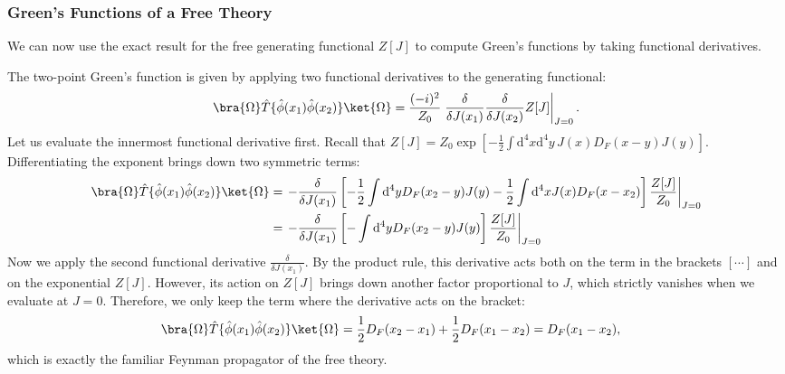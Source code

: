 \subsubsection{Green's Functions of a Free Theory}

We can now use the exact result for the free generating functional \(Z[J]\) to compute Green's functions by taking functional derivatives.

\begin{example}
    The two-point Green's function is given by applying two functional derivatives to the generating functional:
    \[
        \bra{\Omega} \hat{T} \{\hat{\phi}(x_1) \hat{\phi}(x_2)\} \ket{\Omega} = \frac{(-i)^2}{Z_0} \left. \frac{\delta}{\delta J(x_1)} \frac{\delta}{\delta J(x_2)} Z[J] \right|_{J=0}.
    \]
    Let us evaluate the innermost functional derivative first. Recall that \(Z[J] = Z_0 \exp[-\frac{1}{2} \int \mathrm{d}^4x \mathrm{d}^4y \, J(x)D_F(x-y)J(y)]\). Differentiating the exponent brings down two symmetric terms:
    \[
        \begin{aligned}
            \bra{\Omega} \hat{T} \{\hat{\phi}(x_1) \hat{\phi}(x_2)\} \ket{\Omega} & = \left. -\frac{\delta}{\delta J(x_1)} \left[ -\frac{1}{2} \int \mathrm{d}^4 y D_F(x_2-y) J(y) - \frac{1}{2} \int \mathrm{d}^4 x J(x) D_F(x-x_2) \right] \frac{Z[J]}{Z_0} \right|_{J=0} \\
                                                                                  & = \left. -\frac{\delta}{\delta J(x_1)} \left[ -\int \mathrm{d}^4 y D_F(x_2-y) J(y) \right] \frac{Z[J]}{Z_0} \right|_{J=0}
        \end{aligned}
    \]
    Now we apply the second functional derivative \(\frac{\delta}{\delta J(x_1)}\). By the product rule, this derivative acts both on the term in the brackets \([\cdots]\) and on the exponential \(Z[J]\). However, its action on \(Z[J]\) brings down another factor proportional to \(J\), which strictly vanishes when we evaluate at \(J=0\). Therefore, we only keep the term where the derivative acts on the bracket:
    \[
        \begin{aligned}
            \bra{\Omega} \hat{T} \{\hat{\phi}(x_1) \hat{\phi}(x_2)\} \ket{\Omega} & = \frac{1}{2} D_F(x_2 - x_1) + \frac{1}{2} D_F(x_1 - x_2) = D_F(x_1 - x_2),
        \end{aligned}
    \]
    which is exactly the familiar Feynman propagator of the free theory.
\end{example}

